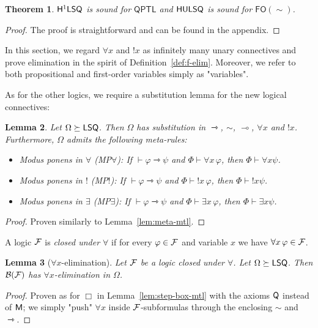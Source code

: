 \documentclass[a4paper,english,fleqn,11pt,final]{scrartcl}
\newcommand{\negg}{{\sim}}
\newcommand{\logic}[1]{\ensuremath{\mathsf{#1}}\xspace}
\newcommand{\FO}{\logic{FO}}
\newcommand{\QPTL}{\logic{QPTL}}
\newcommand{\calB}{\protect\ensuremath{\mathcal{B}}}
\newcommand{\calF}{\protect\ensuremath{\mathcal{F}}}
\newcommand{\sfS}{\protect\ensuremath{\mathsf{S}}}
\newcommand{\sfH}{\protect\ensuremath{\mathsf{H}}}
\newcommand{\sfL}{\protect\ensuremath{\mathsf{L}}}
\newcommand{\sfM}{\protect\ensuremath{\mathsf{M}}}
\newcommand{\sfQ}{\protect\ensuremath{\mathsf{Q}}}
\newcommand{\sfU}{\protect\ensuremath{\mathsf{U}}}
\newcommand{\limp}{\multimap}
\newcommand{\timp}{\rightarrowtriangle}
\newcommand{\Deriv}[1]{{\normalfont\textsf{#1}}}
\DeclareMathOperator{\shriek}{!}
\theoremstyle{plain}
\newtheorem{theorem}{Theorem}[section]
\newtheorem{lemma}[theorem]{Lemma}
\theoremstyle{definition}
\begin{document}
\begin{theorem}\label{thm:soundness-fo}
$\sfH^1\sfL\sfS\sfQ$ is sound for $\QPTL$ and $\sfH\sfU\sfL\sfS\sfQ$ is sound for $\FO(\negg)$.
\end{theorem}
\begin{proof}
The proof is straightforward and can be found in the appendix.
\end{proof}

In this section, we regard $\forall x$ and $\shriek x$ as infinitely many unary connectives and prove elimination in the spirit of Definition~\ref{def:f-elim}.
Moreover, we refer to both propositional and first-order variables simply as "variables".

As for the other logics, we require a substitution lemma for the new logical connectives:

\begin{lemma}\label{lem:fo-meta}
Let $\Omega\succeq \sfL\sfS\sfQ$.
Then $\Omega$ has substitution in $\timp$, $\negg$, $\limp$, $\forall x$ and $\shriek x$.
Furthermore, $\Omega$ admits the following meta-rules:
\begin{itemize}
	\item Modus ponens in $\forall$ \Deriv{(MP$\forall$)}:
	If $\vdash \varphi \timp \psi$ and $\Phi \vdash \forall x\, \varphi$, then $\Phi \vdash \forall x \psi$.
	\item Modus ponens in $\shriek$ \Deriv{(MP$\shriek$)}:
	If $\vdash \varphi \timp \psi$ and $\Phi \vdash \shriek x\, \varphi$, then $\Phi \vdash \shriek x \psi$.
	\item Modus ponens in $\exists$ \Deriv{(MP$\exists$)}:
	If $\vdash \varphi \timp \psi$ and $\Phi \vdash \exists x\, \varphi$, then $\Phi \vdash \exists x \psi$.
\end{itemize}
\end{lemma}
\begin{proof}
Proven similarly to Lemma~\ref{lem:meta-mtl}.
\end{proof}

A logic $\calF$ is \emph{closed under $\forall$} if for every $\varphi \in \calF$ and variable $x$ we have $\forall x\, \varphi \in \calF$.

\begin{lemma}[$\forall x$-elimination]\label{lem:forall-elim}
Let $\calF$ be a logic closed under $\forall$. Let $\Omega \succeq \sfL\sfS\sfQ$.
Then $\calB(\calF)$ has $\forall x$-elimination in $\Omega$.
\end{lemma}
\begin{proof}
Proven as for $\Box$ in Lemma~\ref{lem:step-box-mtl} with the axioms $\sfQ$ instead of $\sfM$;
we simply "push" $\forall x$ inside $\calF$-subformulas through the enclosing $\negg$ and $\timp$.
\end{proof}
\end{document}

